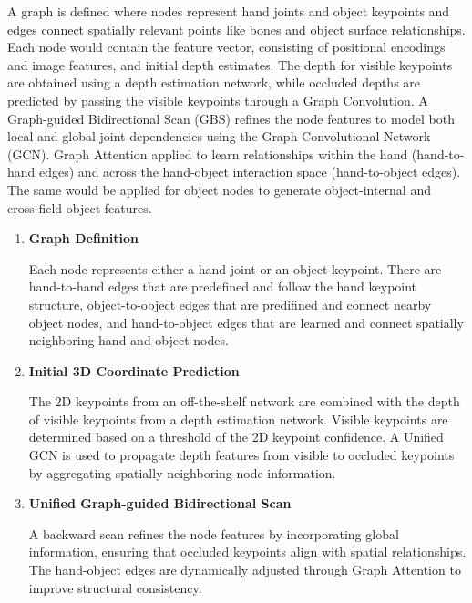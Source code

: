 \documentclass{article}
\begin{document}
A graph is defined where nodes represent hand joints and object keypoints and edges connect spatially relevant points like bones and object surface relationships. Each node would contain the feature vector, consisting of positional encodings and image features, and initial depth estimates. The depth for visible keypoints are obtained using a depth estimation network, while occluded depths are predicted by passing the visible keypoints through a Graph Convolution. A Graph-guided Bidirectional Scan (GBS) refines the node features to model both local and global joint dependencies using the Graph Convolutional Network (GCN). Graph Attention applied to learn relationships within the hand (hand-to-hand edges) and across the hand-object interaction space (hand-to-object edges). The same would be applied for object nodes to generate object-internal and cross-field object features.

\begin{enumerate}
    \item \textbf{Graph Definition}
    
    Each node represents either a hand joint or an object keypoint. There are hand-to-hand edges that are predefined and follow the hand keypoint structure, object-to-object edges that are predifined and connect nearby object nodes, and hand-to-object edges that are learned and connect spatially neighboring hand and object nodes.

    \item \textbf{Initial 3D Coordinate Prediction}
    
    The 2D keypoints from an off-the-shelf network are combined with the depth of visible keypoints from a depth estimation network. Visible keypoints are determined based on a threshold of the 2D keypoint confidence. A Unified GCN is used to propagate depth features from visible to occluded keypoints by aggregating spatially neighboring node information.

    \item \textbf{Unified Graph-guided Bidirectional Scan}
    
    A backward scan refines the node features by incorporating global information, ensuring that occluded keypoints align with spatial relationships. The hand-object edges are dynamically adjusted through Graph Attention to improve structural consistency.

\end{enumerate}
\end{document}

